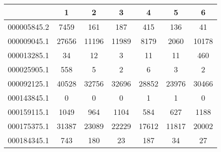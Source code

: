 \begin{tabular}{|l||c|c|c|c|c|c|}
\hline
& 1 & 2 & 3 & 4 & 5 & 6 \\
\hline
\hline
000005845.2 & \cellcolor[RGB]{235, 71, 71} 7459 & \cellcolor[RGB]{246, 246, 254} 161 & \cellcolor[RGB]{253, 241, 241} 187 & \cellcolor[RGB]{235, 71, 71} 415 & \cellcolor[RGB]{223, 223, 251} 136 & \cellcolor[RGB]{94, 94, 237} 41 \\
\hline
000009045.1 & \cellcolor[RGB]{235, 71, 71} 27656 & \cellcolor[RGB]{254, 246, 246} 11196 & \cellcolor[RGB]{252, 232, 232} 11989 & \cellcolor[RGB]{223, 223, 251} 8179 & \cellcolor[RGB]{94, 94, 237} 2060 & \cellcolor[RGB]{250, 250, 254} 10178 \\
\hline
000013285.1 & \cellcolor[RGB]{235, 71, 71} 34 & \cellcolor[RGB]{252, 232, 232} 12 & \cellcolor[RGB]{48, 48, 232} 3 & \cellcolor[RGB]{232, 232, 252} 11 & \cellcolor[RGB]{232, 232, 252} 11 & \cellcolor[RGB]{235, 71, 71} 460 \\
\hline
000025905.1 & \cellcolor[RGB]{235, 71, 71} 558 & \cellcolor[RGB]{253, 237, 237} 5 & \cellcolor[RGB]{227, 227, 252} 2 & \cellcolor[RGB]{251, 223, 223} 6 & \cellcolor[RGB]{241, 241, 253} 3 & \cellcolor[RGB]{227, 227, 252} 2 \\
\hline
000092125.1 & \cellcolor[RGB]{235, 71, 71} 40528 & \cellcolor[RGB]{253, 241, 241} 32756 & \cellcolor[RGB]{253, 241, 241} 32696 & \cellcolor[RGB]{227, 227, 252} 28852 & \cellcolor[RGB]{172, 172, 246} 23976 & \cellcolor[RGB]{241, 241, 253} 30466 \\
\hline
000143845.1 & \cellcolor[RGB]{255, 255, 255} 0 & \cellcolor[RGB]{255, 255, 255} 0 & \cellcolor[RGB]{255, 255, 255} 0 & \cellcolor[RGB]{235, 71, 71} 1 & \cellcolor[RGB]{235, 71, 71} 1 & \cellcolor[RGB]{255, 255, 255} 0 \\
\hline
000159115.1 & \cellcolor[RGB]{254, 250, 250} 1049 & \cellcolor[RGB]{250, 250, 254} 964 & \cellcolor[RGB]{253, 241, 241} 1104 & \cellcolor[RGB]{218, 218, 251} 584 & \cellcolor[RGB]{223, 223, 251} 627 & \cellcolor[RGB]{252, 232, 232} 1188 \\
\hline
000175375.1 & \cellcolor[RGB]{235, 71, 71} 31387 & \cellcolor[RGB]{252, 232, 232} 23089 & \cellcolor[RGB]{253, 241, 241} 22229 & \cellcolor[RGB]{223, 223, 251} 17612 & \cellcolor[RGB]{172, 172, 246} 11817 & \cellcolor[RGB]{246, 246, 254} 20002 \\
\hline
000184345.1 & \cellcolor[RGB]{235, 71, 71} 743 & \cellcolor[RGB]{252, 232, 232} 180 & \cellcolor[RGB]{232, 232, 252} 23 & \cellcolor[RGB]{252, 232, 232} 187 & \cellcolor[RGB]{232, 232, 252} 34 & \cellcolor[RGB]{232, 232, 252} 27 \\

\end{tabular}
